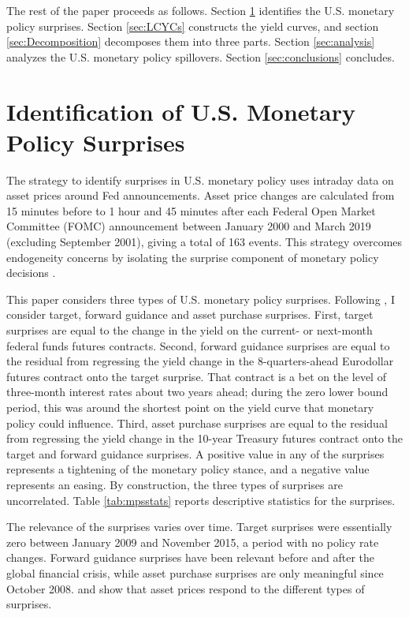 \documentclass[a4paper, 12pt]{article}
\begin{document}
The rest of the paper proceeds as follows. Section \ref{sec:USMPS} identifies the U.S. monetary policy surprises. Section \ref{sec:LCYCs} constructs the yield curves, and section \ref{sec:Decomposition} decomposes them into three parts. Section \ref{sec:analysis} analyzes the U.S. monetary policy spillovers. Section \ref{sec:conclusions} concludes. 


\section{Identification of U.S. Monetary Policy Surprises} \label{sec:USMPS}
The strategy to identify surprises in U.S. monetary policy uses intraday data on asset prices around Fed announcements. Asset price changes are calculated from 15 minutes before to 1 hour and 45 minutes after each Federal Open Market Committee (FOMC) announcement between January 2000 and March 2019 (excluding September 2001), giving a total of 163 events. This strategy overcomes endogeneity concerns by isolating the surprise component of monetary policy decisions \citep{NakamuraSteinsson:2018JEP}. 

This paper considers three types of U.S. monetary policy surprises. Following \cite{RogersScottiWright:2018}, I consider target, forward guidance and asset purchase surprises. First, target surprises are equal to the change in the yield on the current- or next-month federal funds futures contracts. Second, forward guidance surprises are equal to the residual from regressing the yield change in the 8-quarters-ahead Eurodollar futures contract onto the target surprise. That contract is a bet on the level of three-month interest rates about two years ahead; during the zero lower bound period, this was around the shortest point on the yield curve that monetary policy could influence. Third, asset purchase surprises are equal to the residual from regressing the yield change in the 10-year Treasury futures contract onto the target and forward guidance surprises. A positive value in any of the surprises represents a tightening of the monetary policy stance, and a negative value represents an easing. By construction, the three types of surprises are uncorrelated. Table \ref{tab:mpsstats} reports descriptive statistics for the surprises. 

The relevance of the surprises varies over time. Target surprises were essentially zero between January 2009 and November 2015, a period with no policy rate changes. Forward guidance surprises have been relevant before and after the global financial crisis, while asset purchase surprises are only meaningful since October 2008. \cite{GSS:2005a} and \cite{Swanson:2021} show that asset prices respond to the different types of surprises. 
\end{document}
